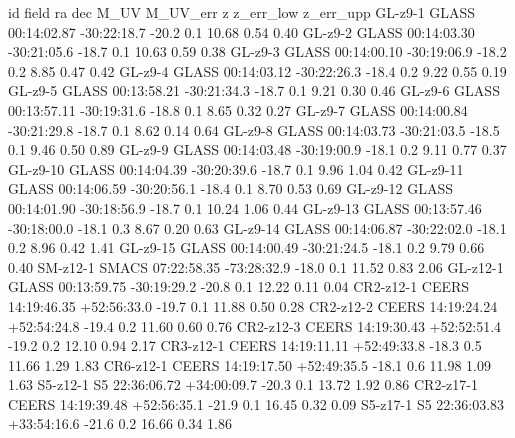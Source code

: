 id field ra dec M_UV M_UV_err z z_err_low z_err_upp
GL-z9-1 GLASS   00:14:02.87   -30:22:18.7      -20.2 0.1   10.68 0.54 0.40  
GL-z9-2 GLASS   00:14:03.30   -30:21:05.6      -18.7 0.1   10.63 0.59 0.38
GL-z9-3 GLASS   00:14:00.10   -30:19:06.9      -18.2 0.2   8.85 0.47 0.42
GL-z9-4 GLASS  00:14:03.12   -30:22:26.3      -18.4 0.2   9.22 0.55 0.19
GL-z9-5 GLASS  00:13:58.21   -30:21:34.3      -18.7 0.1   9.21 0.30 0.46
GL-z9-6 GLASS  00:13:57.11   -30:19:31.6      -18.8 0.1   8.65 0.32 0.27
GL-z9-7 GLASS  00:14:00.84   -30:21:29.8      -18.7 0.1   8.62 0.14 0.64
GL-z9-8 GLASS  00:14:03.73   -30:21:03.5      -18.5 0.1   9.46 0.50 0.89
GL-z9-9 GLASS  00:14:03.48   -30:19:00.9     -18.1 0.2   9.11 0.77 0.37
GL-z9-10 GLASS  00:14:04.39   -30:20:39.6      -18.7 0.1   9.96 1.04 0.42
GL-z9-11 GLASS  00:14:06.59   -30:20:56.1     -18.4 0.1   8.70 0.53 0.69
GL-z9-12 GLASS  00:14:01.90   -30:18:56.9      -18.7 0.1   10.24 1.06 0.44
GL-z9-13 GLASS  00:13:57.46   -30:18:00.0      -18.1 0.3   8.67 0.20 0.63
GL-z9-14 GLASS  00:14:06.87   -30:22:02.0      -18.1 0.2   8.96 0.42 1.41
GL-z9-15 GLASS  00:14:00.49   -30:21:24.5      -18.1 0.2   9.79 0.66 0.40
SM-z12-1 SMACS   07:22:58.35   -73:28:32.9    -18.0 0.1   11.52 0.83 2.06
GL-z12-1 GLASS   00:13:59.75   -30:19:29.2    -20.8 0.1   12.22 0.11 0.04
CR2-z12-1 CEERS   14:19:46.35   +52:56:33.0    -19.7 0.1   11.88 0.50 0.28
CR2-z12-2 CEERS   14:19:24.24   +52:54:24.8  -19.4 0.2   11.60 0.60 0.76
CR2-z12-3 CEERS   14:19:30.43   +52:52:51.4  -19.2 0.2   12.10 0.94 2.17
CR3-z12-1 CEERS   14:19:11.11   +52:49:33.8  -18.3 0.5   11.66 1.29 1.83
CR6-z12-1 CEERS   14:19:17.50   +52:49:35.5  -18.1 0.6   11.98 1.09 1.63
S5-z12-1 S5   22:36:06.72   +34:00:09.7    -20.3 0.1   13.72 1.92 0.86
CR2-z17-1 CEERS   14:19:39.48   +52:56:35.1    -21.9 0.1   16.45 0.32 0.09
S5-z17-1 S5   22:36:03.83   +33:54:16.6    -21.6 0.2   16.66 0.34 1.86
